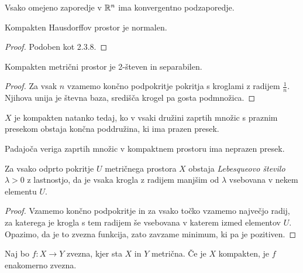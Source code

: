 \begin{posledica}
Vsako omejeno zaporedje v $\mathbb{R}^n$ ima konvergentno podzaporedje.
\end{posledica}

\obvs

\begin{izrek}
Kompakten Hausdorffov prostor je normalen.
\end{izrek}

\begin{proof}
Podoben kot 2.3.8.
\end{proof}

\begin{izrek}
Kompakten metrični prostor je 2-števen in separabilen.
\end{izrek}

\begin{proof}
Za vsak $n$ vzamemo končno podpokritje pokritja s kroglami z
radijem $\frac{1}{n}$. Njihova unija je števna baza, središča
krogel pa gosta podmnožica.
\end{proof}

\begin{trditev}
$X$ je kompakten natanko tedaj, ko v vsaki družini zaprtih množic
s praznim presekom obstaja končna poddružina, ki ima prazen presek.
\end{trditev}

\obvs

\begin{izrek}[Cantor]
Padajoča veriga zaprtih množic v kompaktnem prostoru ima neprazen
presek.
\end{izrek}

\obvs

\begin{lema}[Lebesque]
Za vsako odprto pokritje $U$ metričnega prostora $X$ obstaja
\emph{Lebesqueovo število} $\lambda>0$ z lastnostjo, da je vsaka
krogla z radijem manjšim od $\lambda$ vsebovana v nekem elementu
$U$.
\end{lema}

\begin{proof}
Vzamemo končno podpokritje in za vsako točko vzamemo največjo
radij, za katerega je krogla s tem radijem še vsebovana v katerem
izmed elementov $U$. Opazimo, da je to zvezna funkcija, zato
zavzame minimum, ki pa je pozitiven.
\end{proof}

\begin{posledica}
Naj bo $f \colon X \to Y$ zvezna, kjer sta $X$ in $Y$ metrična. Če
je $X$ kompakten, je $f$ enakomerno zvezna.
\end{posledica}

